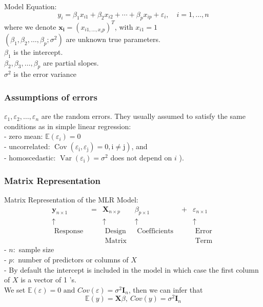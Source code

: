\documentclass[11pt,a4paper]{article}
\begin{document}
Model Equation:
$$
y_{i}=\beta_{1} x_{i 1}+\beta_{2} x_{i 2}+\cdots+\beta_{p} x_{i p}+\varepsilon_{i}, \quad i=1, \ldots, n
$$
where we denote $\mathbf{x}_{\mathbf{i}}=\left(x_{i 1, \ldots, x_{i} p}\right)^{T}$, with $x_{i 1}=1$\\
$\left(\beta_{1}, \beta_{2}, \ldots, \beta_{p} ; \sigma^{2}\right)$ are unknown true parameters.\\
$\beta_{1}$ is the intercept.\\
$\beta_{2}, \beta_{3}, \ldots, \beta_{p}$ are partial slopes.\\
$\sigma^{2}$ is the error variance
\subsubsection{Assumptions of errors}
$\varepsilon_{1}, \varepsilon_{2}, \ldots, \varepsilon_{n}$ are the random errors. They usually assumed to satisfy the same conditions as in simple linear regression:\\
- zero mean: $\mathbb{E}\left(\varepsilon_{i}\right)=0$\\
- uncorrelated: $\left.\operatorname{Cov}\left(\varepsilon_{\mathrm{i}}, \varepsilon_{\mathrm{j}}\right)=0, \mathrm{i} \neq \mathrm{j}\right)$, and\\
- homoscedastic: $\operatorname{Var}\left(\varepsilon_{\mathrm{i}}\right)=\sigma^{2}$ does not depend on $i$ ).

\subsubsection{Matrix Representation}
Matrix Representation of the MLR Model:
$$\begin{array}{cccccc}\mathbf{y}_{n \times 1} & = & \mathbf{X}_{n \times p} & \beta_{p \times 1} & + & \varepsilon_{n \times 1} \\ \uparrow & &\uparrow & \uparrow & &\uparrow \\ \text { Response }& & \text { Design } & \text { Coefficients } & &\text { Error } \\ & & \text { Matrix } & & &\text { Term }\end{array}$$
- $n:$ sample size\\
- $p:$ number of predictors or columns of $X$\\
- By default the intercept is included in the model in which case the first column of $X$ is a vector of 1 's.\\
We set $\mathbb{E}(\varepsilon)=0\text{ and }Cov(\varepsilon)=\sigma^2 \mathbf{I}_n$, then we can infer that
$$\mathbb{E}(y)= \mathbf{X}\beta,\ Cov(y)=\sigma^2 \mathbf{I}_n$$
\end{document}
